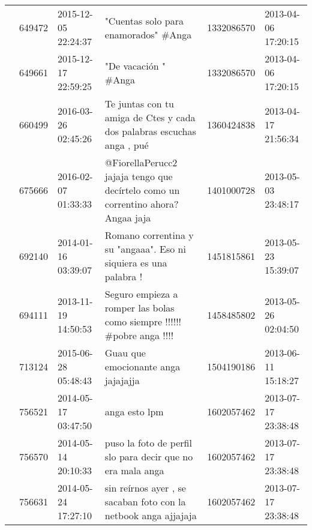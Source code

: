 \begin{tabular}{llllrl}
           & 649472  & 2015-12-05 22:24:37 &                                                                                                         "Cuentas solo para enamorados" \#Anga &  1332086570 & 2013-04-06 17:20:15 \\
           & 649661  & 2015-12-17 22:59:25 &                                                                                                                         "De vacación " \#Anga &  1332086570 & 2013-04-06 17:20:15 \\
           & 660499  & 2016-03-26 02:45:26 &                                                                       Te juntas con tu amiga de Ctes y cada dos palabras escuchas anga , pué &  1360424838 & 2013-04-17 21:56:34 \\
           & 675666  & 2016-02-07 01:33:33 &                                                             @FiorellaPerucc2 jajaja tengo que decírtelo como un correntino ahora? Angaa jaja &  1401000728 & 2013-05-03 23:48:17 \\
           & 692140  & 2014-01-16 03:39:07 &                                                                            Romano correntina y su "angaaa". Eso ni siquiera es una palabra ! &  1451815861 & 2013-05-23 15:39:07 \\
           & 694111  & 2013-11-19 14:50:53 &                                                                      Seguro empieza a romper las bolas como siempre !!!!!!  \#pobre anga !!!! &  1458485802 & 2013-05-26 02:04:50 \\
           & 713124  & 2015-06-28 05:48:43 &                                                                                                          Guau que emocionante anga jajajajja &  1504190186 & 2013-06-11 15:18:27 \\
           & 756521  & 2014-05-17 03:47:50 &                                                                                                                                anga esto lpm &  1602057462 & 2013-07-17 23:38:48 \\
           & 756570  & 2014-05-14 20:10:33 &                                                                                   puso la foto de perfil slo para decir que no era mala anga &  1602057462 & 2013-07-17 23:38:48 \\
           & 756631  & 2014-05-24 17:27:10 &                                                                              sin reírnos ayer , se sacaban foto con la netbook anga ajjajaja &  1602057462 & 2013-07-17 23:38:48 \\

\end{tabular}
